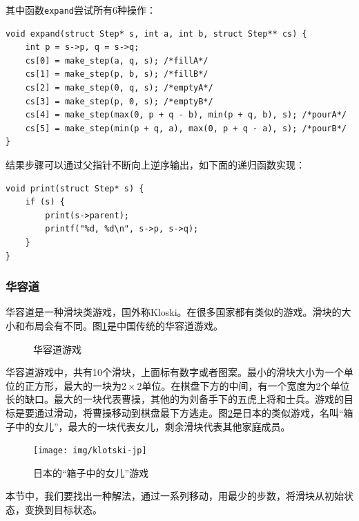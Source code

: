 \documentclass[b5paper]{ctexart}
\begin{document}
其中函数\texttt{expand}尝试所有6种操作：

\lstset{language=C}
\begin{lstlisting}
void expand(struct Step* s, int a, int b, struct Step** cs) {
    int p = s->p, q = s->q;
    cs[0] = make_step(a, q, s); /*fillA*/
    cs[1] = make_step(p, b, s); /*fillB*/
    cs[2] = make_step(0, q, s); /*emptyA*/
    cs[3] = make_step(p, 0, s); /*emptyB*/
    cs[4] = make_step(max(0, p + q - b), min(p + q, b), s); /*pourA*/
    cs[5] = make_step(min(p + q, a), max(0, p + q - a), s); /*pourB*/
}
\end{lstlisting}

结果步骤可以通过父指针不断向上逆序输出，如下面的递归函数实现：

\lstset{language=C}
\begin{lstlisting}
void print(struct Step* s) {
    if (s) {
        print(s->parent);
        printf("%d, %d\n", s->p, s->q);
    }
}
\end{lstlisting}

\subsubsection{华容道}

华容道是一种滑块类游戏，国外称Kloski。在很多国家都有类似的游戏。滑块的大小和布局会有不同。图\ref{fig:klotski-cn}是中国传统的华容道游戏。

\begin{figure}[htbp]
 \centering
  \hspace{.01\textwidth}
 \caption{华容道游戏}
 \label{fig:klotski-cn}
\end{figure}

华容道游戏中，共有10个滑块，上面标有数字或者图案。最小的滑块大小为一个单位的正方形，最大的一块为$2 \times 2$单位。在棋盘下方的中间，有一个宽度为2个单位长的缺口。最大的一块代表曹操，其他的为刘备手下的五虎上将和士兵。游戏的目标是要通过滑动，将曹操移动到棋盘最下方逃走。图\ref{fig:klotski-jp}是日本的类似游戏，名叫“箱子中的女儿”，最大的一块代表女儿，剩余滑块代表其他家庭成员。

\begin{figure}[htbp]
 \centering
 \texttt{[image: img/klotski-jp]}
 \caption{日本的“箱子中的女儿”游戏}
 \label{fig:klotski-jp}
\end{figure}

本节中，我们要找出一种解法，通过一系列移动，用最少的步数，将滑块从初始状态，变换到目标状态。
\end{document}
